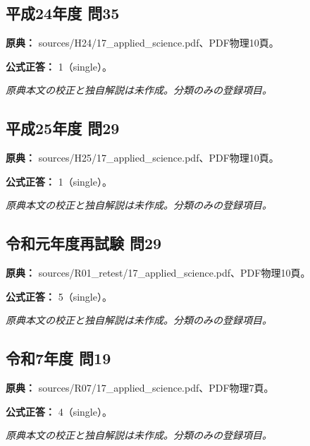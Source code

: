 \subsection{平成24年度 問35}
\label{q:h24-reg-applied-35}

\noindent\textbf{原典：} sources/H24/17\_applied\_science.pdf、PDF物理10頁。

\textbf{公式正答：} 1（single）。

\par\textit{原典本文の校正と独自解説は未作成。分類のみの登録項目。}

\subsection{平成25年度 問29}
\label{q:h25-reg-applied-29}

\noindent\textbf{原典：} sources/H25/17\_applied\_science.pdf、PDF物理10頁。

\textbf{公式正答：} 1（single）。

\par\textit{原典本文の校正と独自解説は未作成。分類のみの登録項目。}

\subsection{令和元年度再試験 問29}
\label{q:r01-ret-applied-29}

\noindent\textbf{原典：} sources/R01\_retest/17\_applied\_science.pdf、PDF物理10頁。

\textbf{公式正答：} 5（single）。

\par\textit{原典本文の校正と独自解説は未作成。分類のみの登録項目。}

\subsection{令和7年度 問19}
\label{q:r07-reg-applied-19}

\noindent\textbf{原典：} sources/R07/17\_applied\_science.pdf、PDF物理7頁。

\textbf{公式正答：} 4（single）。

\par\textit{原典本文の校正と独自解説は未作成。分類のみの登録項目。}
